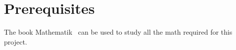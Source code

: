 \chapter{Prerequisites}

The book Mathematik~\cite{arens2015} can be used to study all the math required for this project.



